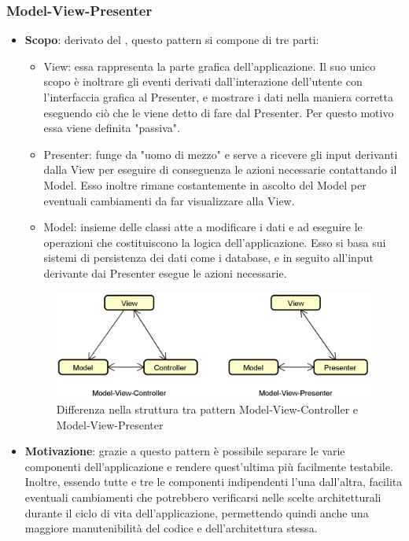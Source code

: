 \subsubsection{Model-View-Presenter}
\begin{itemize}
	\item \textbf{Scopo}: derivato del , questo pattern si compone di tre parti:
		  \begin{itemize}
		    	\item View: essa rappresenta la parte grafica dell'applicazione. Il suo unico scopo è inoltrare gli eventi derivati dall'interazione dell'utente con l'interfaccia grafica al Presenter, e mostrare i dati nella maniera corretta eseguendo ciò che le viene detto di fare dal Presenter. Per questo motivo essa viene definita "passiva".
		    	\item Presenter: funge da "uomo di mezzo" e serve a ricevere gli input derivanti dalla View per eseguire di conseguenza le azioni necessarie contattando il Model. Esso inoltre rimane costantemente in ascolto del Model per eventuali cambiamenti da far visualizzare alla View.
		    	\item Model: insieme delle classi atte a modificare i dati e ad eseguire le operazioni che costituiscono la logica dell'applicazione. Esso si basa sui sistemi di persistenza dei dati come i database, e in seguito all'input derivante dai Presenter esegue le azioni necessarie.
		  \end{itemize}	
		  \begin{figure}[H]
		  \centering
		  \includegraphics[scale=0.45]{Sezioni/DesignPatterns/ModelViewControllerEModelViewPresenter.png}
		  \caption{Differenza nella struttura tra pattern Model-View-Controller e Model-View-Presenter}
		  \end{figure}	   
	\item \textbf{Motivazione}: grazie a questo pattern è possibile separare le varie componenti dell'applicazione e rendere quest'ultima più facilmente testabile. Inoltre, essendo tutte e tre le componenti indipendenti l'una dall'altra, facilita eventuali cambiamenti che potrebbero verificarsi nelle scelte architetturali durante il ciclo di vita dell'applicazione, permettendo quindi anche una maggiore manutenibilità del codice e dell'architettura stessa.

\end{itemize}
